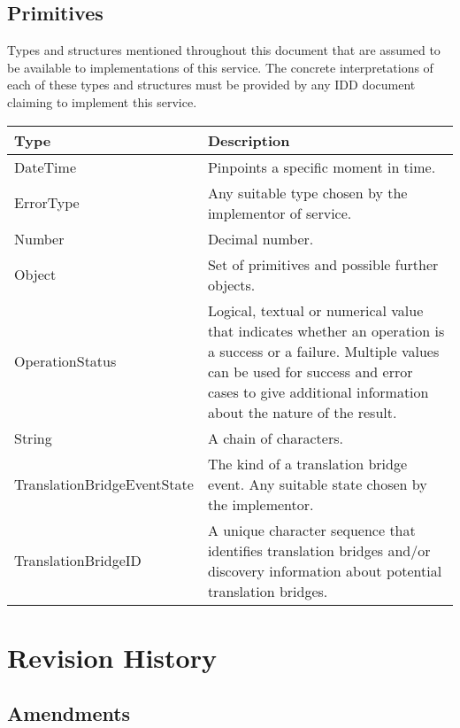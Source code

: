 \documentclass[a4paper]{arrowhead}
\newcommand{\pdef}[1]{{\textcolor{ArrowheadGrey}{#1\label{sec:model:primitives:#1}\label{sec:model:primitives:#1s}\label{sec:model:primitives:#1es}}}}
\begin{document}
\subsection{Primitives}
\label{sec:model:primitives}

Types and structures mentioned throughout this document that are assumed to be available to implementations of this service.
The concrete interpretations of each of these types and structures must be provided by any IDD document claiming to implement this service.


\begin{table}[ht!]
\begin{tabularx}{\textwidth}{| p{5cm} | X |} \hline
\rowcolor{gray!33} Type & Description \\ \hline
\pdef{DateTime}         & Pinpoints a specific moment in time. \\ \hline
\pdef{ErrorType}        & Any suitable type chosen by the implementor of service. \\ \hline
\pdef{Number}           & Decimal number. \\ \hline
\pdef{Object}           & Set of primitives and possible further objects. \\ \hline
\pdef{OperationStatus}  & Logical, textual or numerical value that indicates whether an operation is a success or a failure. Multiple values can be used for success and error cases to give additional information about the nature of the result. \\ \hline
\pdef{String}           & A chain of characters. \\ \hline
\pdef{TranslationBridgeEventState} & The kind of a translation bridge event. Any suitable state chosen by the implementor. \\ \hline
\pdef{TranslationBridgeID} & A unique character sequence that identifies translation bridges and/or discovery information about potential translation bridges. \\ \hline
\end{tabularx}
\end{table}

\newpage




\newpage

\section{Revision History}
\subsection{Amendments}
\end{document}
